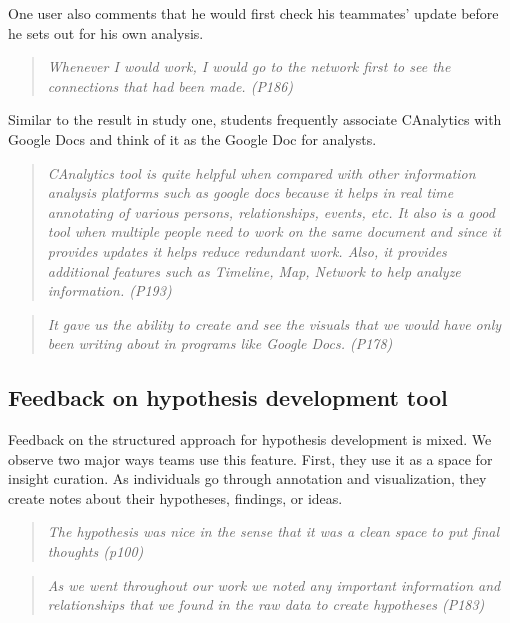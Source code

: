 One user also comments that he would first check his teammates' update before he sets out for his own analysis. 

\begin{quote}
\emph{Whenever I would work, I would go to the network first to see the connections that had been made. (P186)}
\end{quote}

Similar to the result in study one, students frequently associate CAnalytics with Google Docs and think of it as the Google Doc for analysts. 

\begin{quote}
\emph{CAnalytics tool is quite helpful when compared with other information analysis platforms such as google docs because it helps in real time annotating of various persons, relationships, events, etc. It also is a good tool when multiple people need to work on the same document and since it provides updates it helps reduce redundant work. Also, it provides additional features such as Timeline, Map, Network to help analyze information. (P193)}
\end{quote}

\begin{quote}
\emph{It gave us the ability to create and see the visuals that we would have only been writing about in programs like Google Docs. (P178)}
\end{quote}


\subsection{Feedback on hypothesis development tool}

Feedback on the structured approach for hypothesis development is mixed. We observe two major ways teams use this feature. First, they use it as a space for insight curation. As individuals go through annotation and visualization, they create notes about their hypotheses, findings, or ideas.

\begin{quote}
	\emph{The hypothesis was nice in the sense that it was a clean space to put final thoughts (p100)}
\end{quote} 

\begin{quote}
	\emph{As we went throughout our work we noted any important information and relationships that we found in the raw data to create hypotheses (P183)}
\end{quote}

